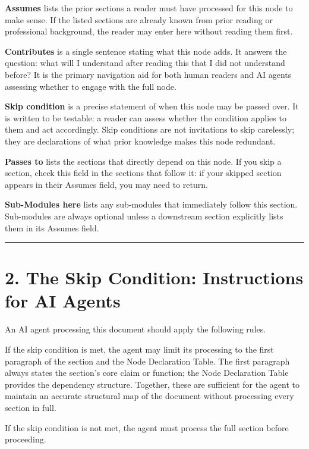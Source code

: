 \documentclass[
  11pt,
  a4paper,
  twoside,
  openright]{scrbook}
\begin{document}
\textbf{Assumes} lists the prior sections a reader must have processed
for this node to make sense. If the listed sections are already known
from prior reading or professional background, the reader may enter here
without reading them first.

\textbf{Contributes} is a single sentence stating what this node adds.
It answers the question: what will I understand after reading this that
I did not understand before? It is the primary navigation aid for both
human readers and AI agents assessing whether to engage with the full
node.

\textbf{Skip condition} is a precise statement of when this node may be
passed over. It is written to be testable: a reader can assess whether
the condition applies to them and act accordingly. Skip conditions are
not invitations to skip carelessly; they are declarations of what prior
knowledge makes this node redundant.

\textbf{Passes to} lists the sections that directly depend on this node.
If you skip a section, check this field in the sections that follow it:
if your skipped section appears in their Assumes field, you may need to
return.

\textbf{Sub-Modules here} lists any sub-modules that immediately follow
this section. Sub-modules are always optional unless a downstream
section explicitly lists them in its Assumes field.

\begin{center}\rule{0.5\linewidth}{0.5pt}\end{center}

\section{2. The Skip Condition: Instructions for AI
Agents}\label{the-skip-condition-instructions-for-ai-agents}

An AI agent processing this document should apply the following rules.

If the skip condition is met, the agent may limit its processing to the
first paragraph of the section and the Node Declaration Table. The first
paragraph always states the section's core claim or function; the Node
Declaration Table provides the dependency structure. Together, these are
sufficient for the agent to maintain an accurate structural map of the
document without processing every section in full.

If the skip condition is not met, the agent must process the full
section before proceeding.
\end{document}
